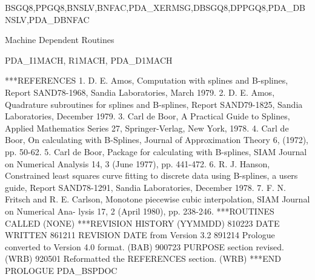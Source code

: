 \documentclass[11pt,twoside,nolof]{starlink}
\begin{document}
\begin{terminalv}
       BSGQ8,PPGQ8,BNSLV,BNFAC,PDA_XERMSG,DBSGQ8,DPPGQ8,PDA_DBNSLV,PDA_DBNFAC

                    Machine Dependent Routines

                      PDA_I1MACH, R1MACH, PDA_D1MACH

***REFERENCES  1. D. E. Amos, Computation with splines and
                 B-splines, Report SAND78-1968, Sandia
                 Laboratories, March 1979.
               2. D. E. Amos, Quadrature subroutines for splines and
                 B-splines, Report SAND79-1825, Sandia Laboratories,
                 December 1979.
               3. Carl de Boor, A Practical Guide to Splines, Applied
                 Mathematics Series 27, Springer-Verlag, New York,
                 1978.
               4. Carl de Boor, On calculating with B-Splines, Journal
                 of Approximation Theory 6, (1972), pp. 50-62.
               5. Carl de Boor, Package for calculating with B-splines,
                 SIAM Journal on Numerical Analysis 14, 3 (June 1977),
                 pp. 441-472.
               6. R. J. Hanson, Constrained least squares curve fitting
                 to discrete data using B-splines, a users guide,
                 Report SAND78-1291, Sandia Laboratories, December
                 1978.
               7. F. N. Fritsch and R. E. Carlson, Monotone piecewise
                 cubic interpolation, SIAM Journal on Numerical Ana-
                 lysis 17, 2 (April 1980), pp. 238-246.
***ROUTINES CALLED  (NONE)
***REVISION HISTORY  (YYMMDD)
   810223  DATE WRITTEN
   861211  REVISION DATE from Version 3.2
   891214  Prologue converted to Version 4.0 format.  (BAB)
   900723  PURPOSE section revised.  (WRB)
   920501  Reformatted the REFERENCES section.  (WRB)
***END PROLOGUE  PDA_BSPDOC
\end{terminalv}

\end{document}

